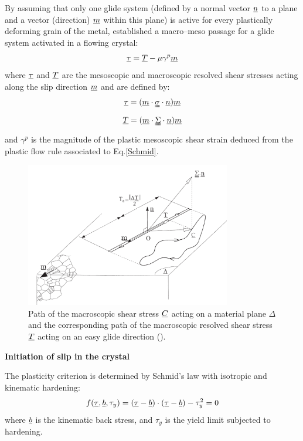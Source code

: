 By assuming that only one glide system (defined by a normal vector $\uline{n}$ to a plane and a vector
(direction) $\uline{m}$ within this plane) is active for every plastically deforming grain of the metal, \cite{papadopoulos1993fatigue}
established a macro–meso passage for a glide system activated in a flowing crystal:
\begin{equation}
\uline{\tau}=\uline{T}-\mu\gamma^p\uline{m}
\label{macromeso}
\end{equation}
where $\uline{\tau}$ and $\uline{T}$ are the mesoscopic and macroscopic
resolved shear stresses acting along the slip direction $\uline{m}$ and are defined by:
\begin{equation}
\uline{\tau}=(\uline{m}\cdot\uuline{\sigma}\cdot\uline{n})\uline{m}
\label{tau}
\end{equation}
\begin{equation}
\uline{T}=(\uline{m}\cdot\uuline{\Sigma}\cdot\uline{n})\uline{m}
\label{T}
\end{equation}
and $\gamma^p$  is  the magnitude of the plastic mesoscopic shear strain deduced from the plastic flow rule associated to Eq.\ref{Schmid}.
\begin{figure}[h!]
	\centering
	\includegraphics[width=0.8\textwidth]{figures//glid.png} 
	\caption{Path of the macroscopic shear stress $\uline{C}$ acting on a material plane $\Delta$ and the corresponding path of the macroscopic resolved shear stress $\uline{T}$ acting on an easy glide direction (\cite{Morel2000101}).}
	\label{glid}
\end{figure}

\textbf{Initiation of slip in the crystal}

The plasticity criterion is determined by Schmid's law with isotropic and kinematic hardening:
\begin{equation}
f(\uline{\tau},\uline{b},\tau_y)=(\uline{\tau}-\uline{b})\cdot(\uline{\tau}-\uline{b})-\tau_y^2=0
\label{Schmid}
\end{equation}
where $\uline{b}$ is the kinematic back stress, and $\tau_y$ is the yield limit subjected to hardening.

